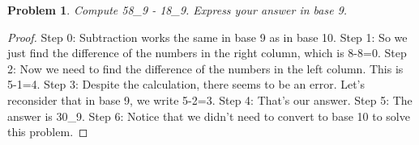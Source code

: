 \documentclass{article}
\newtheorem{theorem}{Problem}
\begin{document}
\begin{theorem}
Compute 58_9 - 18_9. Express your answer in base 9.
\end{theorem}

\begin{proof}
Step 0: Subtraction works the same in base 9 as in base 10.
Step 1: So we just find the difference of the numbers in the right column, which is 8-8=0.
Step 2: Now we need to find the difference of the numbers in the left column. This is 5-1=4.
Step 3: Despite the calculation, there seems to be an error. Let's reconsider that in base 9, we write 5-2=3.
Step 4: That's our answer.
Step 5: The answer is 30_9.
Step 6: Notice that we didn't need to convert to base 10 to solve this problem.
\end{proof}
\end{document}
